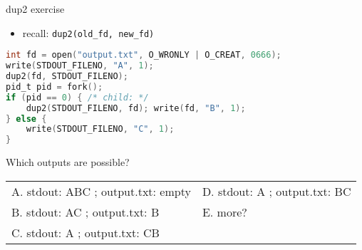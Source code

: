 \begin{frame}[fragile,label=dup2ex]{dup2 exercise}
\begin{itemize}
\item recall: \texttt{dup2(old\_fd, new\_fd)}
\end{itemize}
\begin{lstlisting}[language=C,style=small]
int fd = open("output.txt", O_WRONLY | O_CREAT, 0666);
write(STDOUT_FILENO, "A", 1);
dup2(fd, STDOUT_FILENO);
pid_t pid = fork();
if (pid == 0) { /* child: */
    dup2(STDOUT_FILENO, fd); write(fd, "B", 1);
} else {
    write(STDOUT_FILENO, "C", 1);
}
\end{lstlisting}
Which outputs are possible?\\\small
\begin{tabular}{ll}
A. stdout: ABC ; output.txt: empty & D. stdout: A ; output.txt: BC \\
B. stdout: AC ; output.txt: B &  E. more? \\
C. stdout: A ; output.txt: CB \\
\end{tabular}
\end{frame}
